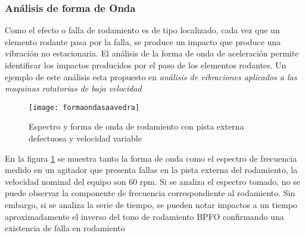			    \subsubsection{Análisis de forma de Onda}
			        Como el efecto o falla de rodamiento es de tipo localizado, cada vez que un elemento rodante pasa por la falla, se produce un impacto que produce una vibración no estacionaria. El análisis de la forma de onda de aceleración permite identificar los impactos producidos por el paso de los elementos rodantes. Un ejemplo de este análisis esta propuesto en \textit{análisis de vibraciones aplicados a las maquinas rotatorias de baja velocidad} \cite{pedrosaav}
			        \begin{figure}
			            \centering
			            \texttt{[image: formaondasaavedra]}
			            \caption{Espectro y forma de onda de rodamiento con pista externa defectuosa y velocidad variable}
			            \label{fig:rodsaav}
			        \end{figure}
			        En la figura \ref{fig:rodsaav} se muestra tanto la forma de onda como el espectro de frecuencia medido en un agitador que presenta fallas en la pista externa del rodamiento, la velocidad nominal del equipo son 60 rpm. Si se analiza el espectro tomado, no se puede observar la componente de frecuencia correspondiente al rodamiento. Sin embargo, si se analiza la serie de tiempo, se pueden notar impactos a un tiempo aproximadamente el inverso del tono de rodamiento BPFO confirmando una existencia de falla en rodamiento
